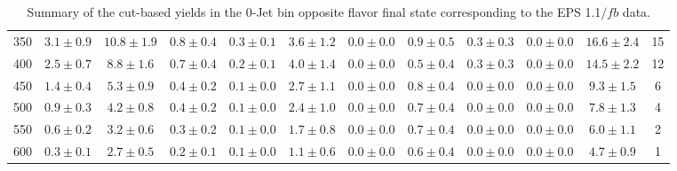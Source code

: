 \begin{table}[!hb]
{\begin{center}
\begin{tabular}{l c c c c c c c c c c c }
350 & $3.1\pm0.9$ & $10.8\pm1.9$ & $0.8\pm0.4$ & $0.3\pm0.1$ & $3.6\pm1.2$ & $0.0\pm0.0$ & $0.9\pm0.5$ & $0.3\pm0.3$ & $0.0\pm0.0$ & $16.6\pm2.4$ & 15 \\
400 & $2.5\pm0.7$ & $8.8\pm1.6$ & $0.7\pm0.4$ & $0.2\pm0.1$ & $4.0\pm1.4$ & $0.0\pm0.0$ & $0.5\pm0.4$ & $0.3\pm0.3$ & $0.0\pm0.0$ & $14.5\pm2.2$ & 12 \\
450 & $1.4\pm0.4$ & $5.3\pm0.9$ & $0.4\pm0.2$ & $0.1\pm0.0$ & $2.7\pm1.1$ & $0.0\pm0.0$ & $0.8\pm0.4$ & $0.0\pm0.0$ & $0.0\pm0.0$ & $9.3\pm1.5$ & 6 \\
500 & $0.9\pm0.3$ & $4.2\pm0.8$ & $0.4\pm0.2$ & $0.1\pm0.0$ & $2.4\pm1.0$ & $0.0\pm0.0$ & $0.7\pm0.4$ & $0.0\pm0.0$ & $0.0\pm0.0$ & $7.8\pm1.3$ & 4 \\
550 & $0.6\pm0.2$ & $3.2\pm0.6$ & $0.3\pm0.2$ & $0.1\pm0.0$ & $1.7\pm0.8$ & $0.0\pm0.0$ & $0.7\pm0.4$ & $0.0\pm0.0$ & $0.0\pm0.0$ & $6.0\pm1.1$ & 2 \\
600 & $0.3\pm0.1$ & $2.7\pm0.5$ & $0.2\pm0.1$ & $0.1\pm0.0$ & $1.1\pm0.6$ & $0.0\pm0.0$ & $0.6\pm0.4$ & $0.0\pm0.0$ & $0.0\pm0.0$ & $4.7\pm0.9$ & 1 \\
\hline
\end{tabular}
\end{center}
}
\caption{Summary of the cut-based yields in the 0-Jet bin opposite flavor final state corresponding to the EPS 1.1$/fb$ data.}
\end{table}
